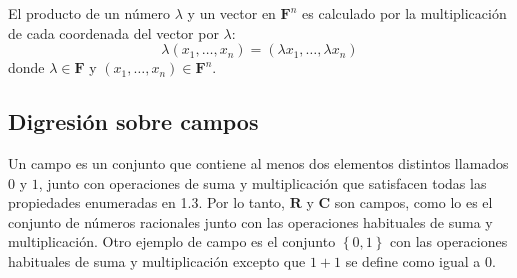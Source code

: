     \begin{mydef}
	El producto de un número $\lambda$ y un vector en $\textbf{F}^n$ es calculado por la multiplicación de cada coordenada del vector por $\lambda$:
	$$\lambda(x_1,\ldots,x_n) = (\lambda x_1,\ldots, \lambda x_n)$$
	donde $\lambda \in \textbf{F}$ y $(x_1,\ldots,x_n)\in \textbf{F}^n$.
    \end{mydef}

\subsection{Digresión sobre campos}
Un campo es un conjunto que contiene al menos dos elementos distintos llamados $0$ y $1$, junto con operaciones de suma y multiplicación que satisfacen todas las propiedades enumeradas en 1.3. Por lo tanto, $\textbf{R}$ y $\textbf{C}$ son campos, como lo es el conjunto de números racionales junto con las operaciones habituales de suma y multiplicación. Otro ejemplo de campo es el conjunto $\left\{0,1\right\}$ con las operaciones habituales de suma y multiplicación excepto que $1 + 1$ se define como igual a $0$.\\\\

\setcounter{mysection}{0}

